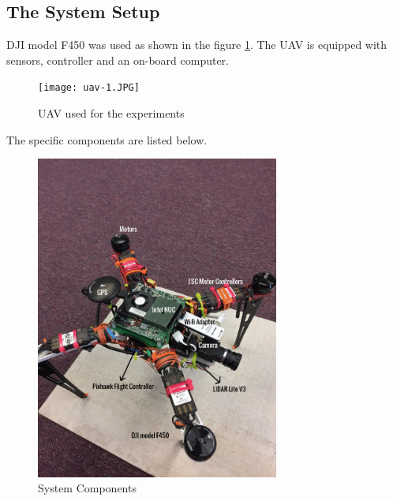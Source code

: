 \documentclass[12pt]{report}
\begin{document}
\subsection{The System Setup}
DJI model F450 \cite{dji_frame} was used as shown in the figure \ref{fig:dji_frame}. The UAV is equipped with sensors, controller and an on-board computer.

\begin{figure}[htp]
	\centering 
    \texttt{[image: uav-1.JPG]}
	\caption{UAV used for the experiments}
   \label{fig:dji_frame}
\end{figure}

The specific components are listed below. 

\begin{figure}[H]
	\centering 
    \includegraphics[width=8cm]{quad.png}
	\caption{System Components}
   \label{fig:system_components}
\end{figure}
\end{document}
